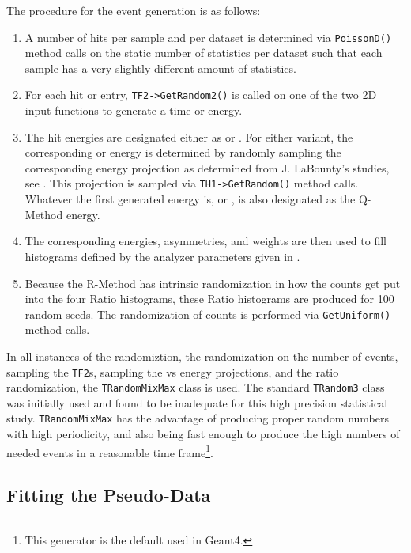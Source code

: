 The procedure for the event generation is as follows:
\begin{enumerate}
	\item{A number of hits per sample and per dataset is determined via \texttt{PoissonD()} method calls on the static number of statistics per dataset such that each sample has a very slightly different amount of statistics.} 
	\item{For each hit or entry, \texttt{TF2->GetRandom2()} is called on one of the two 2D input functions to generate a time or energy.}
	\item{The hit energies are designated either as \RE or \RW. For either variant, the corresponding \RW or \RE energy is determined by randomly sampling the corresponding energy projection as determined from J. LaBounty's studies, see . This projection is sampled via \texttt{TH1->GetRandom()} method calls. Whatever the first generated energy is, \RE or \RW, is also designated as the Q-Method energy.}
	\item{The corresponding energies, asymmetries, and weights are then used to fill histograms defined by the analyzer parameters given in .}
	\item{Because the R-Method has intrinsic randomization in how the counts get put into the four Ratio histograms, these Ratio histograms are produced for 100 random seeds. The randomization of counts is performed via \texttt{GetUniform()} method calls.} 
\end{enumerate}


In all instances of the randomiztion, the randomization on the number of events, sampling the \texttt{TF2}s, sampling the \RE vs \RW energy projections, and the ratio randomization, the \ROOT\texttt{TRandomMixMax} class is used. The standard \texttt{TRandom3} class was initially used and found to be inadequate for this high precision statistical study. \texttt{TRandomMixMax} has the advantage of producing proper random numbers with high periodicity, and also being fast enough to produce the high numbers of needed events in a reasonable time frame\footnote{This generator is the default used in Geant4.}\cite{TRandom}.



\subsection{Fitting the Pseudo-Data}



